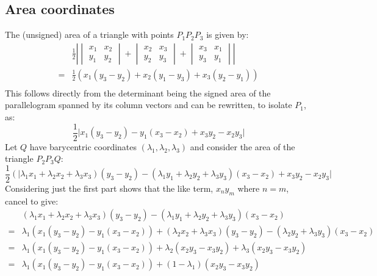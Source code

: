 \subsection{Area coordinates}
\begin{center}
\end{center}
The (unsigned) area of a triangle with points $P_1P_2P_3$ is given by:
\begin{equation*}
\begin{aligned}
	&\frac{1}{2}\left|\begin{vmatrix} x_1&x_2\\y_1&y_2\end{vmatrix} + \begin{vmatrix} x_2&x_3\\y_2&y_3 \end{vmatrix} + \begin{vmatrix} x_3&x_1\\y_3&y_1\end{vmatrix}\right|\\
	=&\frac{1}{2}(x_1(y_3-y_2)+x_2(y_1-y_3)+x_3(y_2-y_1))\\
\end{aligned}
\end{equation*}
This follows directly from the determinant being the signed area of the parallelogram spanned by its column vectors and can be rewritten, to isolate $P_1$, as:
\[\frac{1}{2}\big|x_1(y_3-y_2)-y_1(x_3-x_2)+x_3y_2-x_2y_3\big|\]
Let $Q$ have barycentric coordinates $(\lambda_1,\lambda_2,\lambda_3)$ and consider the area of the triangle $P_2P_3Q$:
\[\frac{1}{2}(\big|\lambda_1x_1+ \lambda_2x_2 + \lambda_3x_3)(y_3-y_2)-(\lambda_1y_1+ \lambda_2y_2 + \lambda_3y_3)(x_3-x_2)+x_3y_2-x_2y_3\big|\]
Considering just the first part shows that the like term, $x_ny_m$ where $n=m$, cancel to give:
\begin{equation*}
\begin{aligned}
	&(\lambda_1x_1+ \lambda_2x_2 + \lambda_3x_3)(y_3-y_2)-(\lambda_1y_1+ \lambda_2y_2 + \lambda_3y_3)(x_3-x_2)\\
	=&\lambda_1(x_1(y_3-y_2)-y_1(x_3-x_2))+ (\lambda_2x_2 + \lambda_3x_3)(y_3-y_2)-(\lambda_2y_2 + \lambda_3y_3)(x_3-x_2)\\
	=&\lambda_1(x_1(y_3-y_2)-y_1(x_3-x_2))+ \lambda_2(x_2y_3-x_3y_2) +\lambda_3(x_2y_3-x_3y_2)\\
	=&\lambda_1(x_1(y_3-y_2)-y_1(x_3-x_2))+ (1-\lambda_1)(x_2y_3-x_3y_2)\\
\end{aligned}
\end{equation*}
